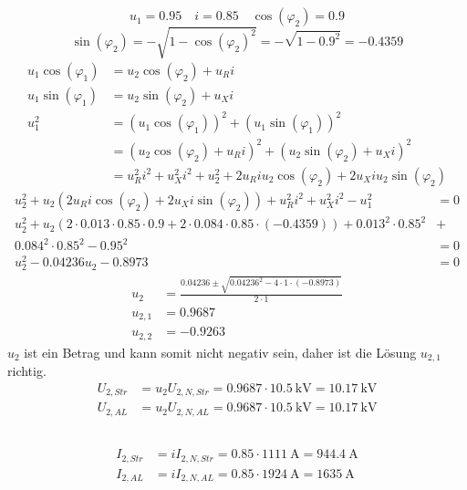 \documentclass[11pt,a4paper]{scrartcl}
\newcommand{\mybr}[1]{\left(#1\right)}
\newcommand{\0}{_{\mybr{0}}}
\newcommand{\1}{_{\mybr{1}}}
\newcommand{\2}{_{\mybr{2}}}
\newcommand{\USS}{U_{2,Str}}
\newcommand{\USA}{U_{2,AL}}
\newcommand{\ISS}{I_{2,Str}}
\newcommand{\ISA}{I_{2,AL}}
\newcommand{\USNS}{U_{2,N,Str}}
\newcommand{\USNA}{U_{2,N,AL}}
\newcommand{\ISNS}{I_{2,N,Str}}
\newcommand{\ISNA}{I_{2,N,AL}}
\newcommand{\ce}{\cos\mybr{\varphi_1}}
\newcommand{\se}{\sin\mybr{\varphi_1}}
\newcommand{\cz}{\cos\mybr{\varphi_2}}
\newcommand{\sz}{\sin\mybr{\varphi_2}}
\begin{document}
\section{}
\subsection{}
\begin{equation}
u_1=\num{0.95}\quad i=\num{0.85}\quad \cos\mybr{\varphi_2}=0.9
\end{equation}
\begin{equation}
\sin\mybr{\varphi_2}=-\sqrt{1-\cz^2}=-\sqrt{1-\num{0.9}^2}=\num{-0.4359}
\end{equation}
\begin{align}
u_1\ce&=u_2\cz+u_R i\\
u_1\se&=u_2\sz+u_X i\\
u_1^2&=\mybr{u_1\ce}^2+\mybr{u_1\se}^2\\
&=\mybr{u_2\cz+u_R i}^2+\mybr{u_2\sz+u_X i}^2\\
&=u_R^2i^2+u_X^2i^2+u_2^2+2u_R i u_2 \cz+2u_X i u_2\sz
\end{align}
\begin{align}
u_2^2+u_2\mybr{2u_R i \cz+2u_X i \sz}+u_R^2 i^2 + u_X^2 i^2 - u_1^2 &= 0\\
u_2^2+u_2\mybr{2\cdot\num{0.013}\cdot\num{0.85}\cdot\num{0.9}+2\cdot\num{0.084}\cdot\num{0.85}\cdot\mybr{\num{-0.4359}}}+\num{0.013}^2\cdot\num{0.85}^2&+\\
\num{0.084}^2\cdot\num{0.85}^2-\num{0.95}^2 &=0\\
u_2^2-\num{0.04236}u_2-\num{0.8973}&=0
\end{align}
\begin{align}
u_2&=\frac{\num{0.04236}\pm\sqrt{\num{0.04236}^2-4\cdot1\cdot\mybr{\num{-0.8973}}}}{2\cdot1}\\
u_{2,1}&=\num{0.9687}\\
u_{2,2}&=\num{-0.9263}
\end{align}
$u_2$ ist ein Betrag und kann somit nicht negativ sein, daher ist die Lösung $u_{2,1}$ richtig.
\begin{align}
\USS&=u_2\USNS=\num{0.9687}\cdot\SI{10.5}{\kilo\volt}=\SI{10.17}{\kilo\volt}\\
\USA&=u_2\USNA=\num{0.9687}\cdot\SI{10.5}{\kilo\volt}=\SI{10.17}{\kilo\volt}
\end{align}

\subsection{}
\begin{align}
\ISS&=i\ISNS=\num{0.85}\cdot\SI{1111}{\ampere}=\SI{944.4}{\ampere}\\
\ISA&=i\ISNA=\num{0.85}\cdot\SI{1924}{\ampere}=\SI{1635}{\ampere}\\
\end{align}
\end{document}
